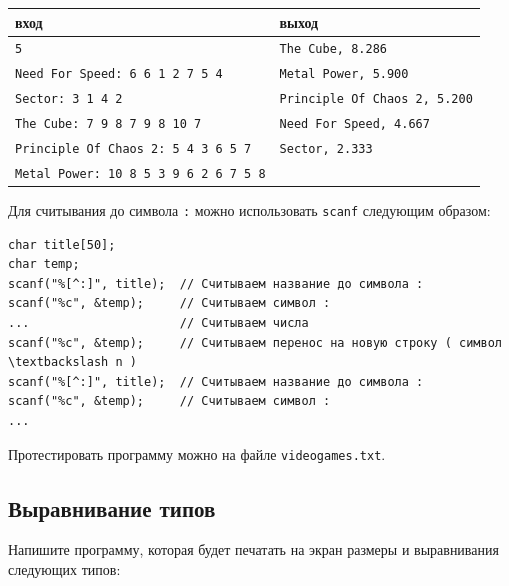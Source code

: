 \documentclass[10pt]{article}
\begin{document}
\begin{center}
\begin{tabular}{ l | l }
 вход & выход \\ \hline
 \texttt{5} & 								  \texttt{The Cube, 8.286} \\
 \texttt{Need For Speed: 6 6 1 2 7 5 4} &      \texttt{Metal Power, 5.900 } \\
 \texttt{Sector: 3 1 4 2} & 					  \texttt{Principle Of Chaos 2, 5.200} \\
 \texttt{The Cube: 7 9 8 7 9 8 10 7} &          \texttt{Need For Speed, 4.667 } \\
 \texttt{Principle Of Chaos 2: 5 4 3 6 5 7} &     \texttt{Sector, 2.333} \\
 \texttt{Metal Power: 10 8 5 3 9 6 2 6 7 5 8} & \\
\end{tabular}
\end{center}
Для считывания до символа \texttt{:} можно использовать \texttt{scanf} следующим образом:
\begin{lstlisting}
char title[50];
char temp;
scanf("%[^:]", title);  // Считываем название до символа :
scanf("%c", &temp);     // Считываем символ :
...                     // Считываем числа
scanf("%c", &temp);     // Считываем перенос на новую строку ( символ \textbackslash n )
scanf("%[^:]", title);  // Считываем название до символа :
scanf("%c", &temp);     // Считываем символ :
...
\end{lstlisting}
Протестировать программу можно на файле \texttt{videogames.txt}.



\subsection{Выравнивание типов}
Напишите программу, которая будет печатать на экран размеры и выравнивания следующих типов:
\end{document}
